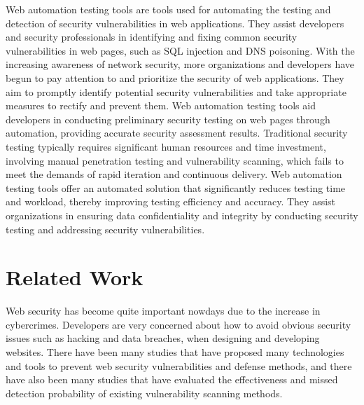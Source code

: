 \documentclass[journal]{IEEEtran}
\begin{document}
Web automation testing tools are tools used for automating the testing and detection of security vulnerabilities in web applications. They assist developers and security professionals in identifying and fixing common security vulnerabilities in web pages, such as SQL injection and DNS poisoning. With the increasing awareness of network security, more organizations and developers have begun to pay attention to and prioritize the security of web applications. They aim to promptly identify potential security vulnerabilities and take appropriate measures to rectify and prevent them. Web automation testing tools aid developers in conducting preliminary security testing on web pages through automation, providing accurate security assessment results. Traditional security testing typically requires significant human resources and time investment, involving manual penetration testing and vulnerability scanning, which fails to meet the demands of rapid iteration and continuous delivery. Web automation testing tools offer an automated solution that significantly reduces testing time and workload, thereby improving testing efficiency and accuracy. They assist organizations in ensuring data confidentiality and integrity by conducting security testing and addressing security vulnerabilities.

\section{Related Work}
\label{sec:relatedwork}
\noindent Web security has become quite important nowdays due to the increase in cybercrimes. Developers are very concerned about how to avoid obvious security issues such as hacking and data breaches, when designing and developing websites. There have been many studies that have proposed many technologies and tools to prevent web security vulnerabilities and defense methods, and there have also been many studies that have evaluated the effectiveness and missed detection probability of existing vulnerability scanning methods. 
\end{document}

